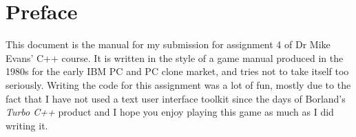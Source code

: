 
\lhead[]{\rightmark}


\rhead[\leftmark]{}


\lfoot[\thepage]{}


\cfoot{}


\rfoot[]{\thepage}


\chapter*{Preface}


This document is the manual for my submission for assignment 4 of
Dr Mike Evans' C++ course. It is written in the style of a game manual
produced in the 1980s for the early IBM PC and PC clone market, and
tries not to take itself too seriously. Writing the code for this
assignment was a lot of fun, mostly due to the fact that I have not
used a text user interface toolkit since the days of Borland's \emph{Turbo
C++} product and I hope you enjoy playing this game as much as I did
writing it.
